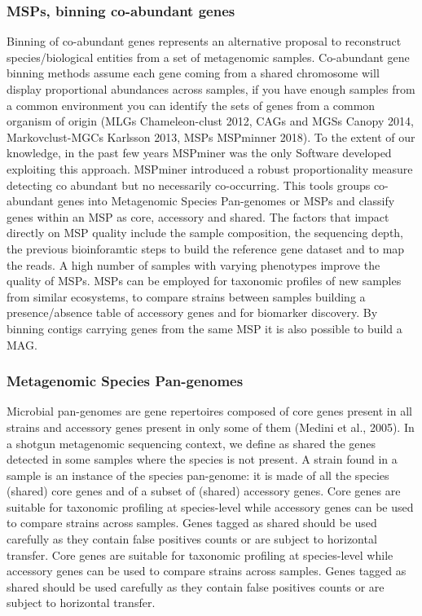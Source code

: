 \documentclass{article}
\begin{document}
\subsubsection{MSPs, binning co-abundant genes}
Binning of co-abundant genes represents an alternative proposal to reconstruct species/biological entities from a set of metagenomic samples.
Co-abundant gene binning methods assume each gene coming from a shared chromosome will display proportional abundances across samples, if you have enough samples from a common environment you can identify the sets of genes from a common organism of origin (MLGs Chameleon-clust 2012, CAGs and MGSs Canopy 2014, Markovclust-MGCs Karlsson 2013, MSPs MSPminner 2018).
To the extent of our knowledge, in the past few years MSPminer was the only Software developed exploiting this approach. MSPminer introduced a robust proportionality measure detecting co abundant but no necessarily co-occurring.
This tools groups co-abundant genes into Metagenomic Species Pan-genomes or \glspl{MSP} and classify genes within an MSP as core, accessory and shared.  
The factors that impact directly on \gls{MSP} quality include the sample composition, the sequencing depth, the previous bioinforamtic steps to build the reference gene dataset and to map the reads.
A high number of samples with varying phenotypes improve the quality of \glspl{MSP}.
MSPs can be employed for taxonomic profiles of new samples from similar ecosystems, to compare strains between samples building a presence/absence table of accessory genes and for biomarker discovery.
By binning contigs carrying genes from the same MSP it is also possible to build a \gls{MAG}.

\subsubsection{Metagenomic Species Pan-genomes}
Microbial pan-genomes are gene repertoires composed of core genes present in all strains and accessory genes present in only some of them (Medini et al., 2005).
In a shotgun metagenomic sequencing context, we define as shared the genes detected in some samples where the species is not present.
A strain found in a sample is an instance of the species pan-genome: it is made of all the species (shared) core genes and of a subset of (shared) accessory genes. Core genes are suitable for taxonomic profiling at species-level while accessory genes can be used to compare strains across samples. Genes tagged as shared should be used carefully as they contain false positives counts or are subject to horizontal transfer.
Core genes are suitable for taxonomic profiling at species-level while accessory genes can be used to compare strains across samples.
Genes tagged as shared should be used carefully as they contain false positives counts or are subject to horizontal transfer.
\end{document}
